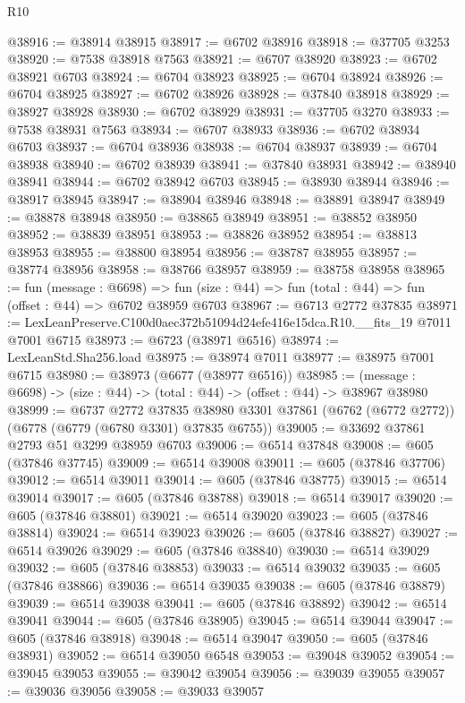\begin{lexlean}{R10}
\begin{coremodule}
@38916 := @38914 @38915
@38917 := @6702 @38916
@38918 := @37705 @3253
@38920 := @7538 @38918 @7563
@38921 := @6707 @38920
@38923 := @6702 @38921 @6703
@38924 := @6704 @38923
@38925 := @6704 @38924
@38926 := @6704 @38925
@38927 := @6702 @38926
@38928 := @37840 @38918
@38929 := @38927 @38928
@38930 := @6702 @38929
@38931 := @37705 @3270
@38933 := @7538 @38931 @7563
@38934 := @6707 @38933
@38936 := @6702 @38934 @6703
@38937 := @6704 @38936
@38938 := @6704 @38937
@38939 := @6704 @38938
@38940 := @6702 @38939
@38941 := @37840 @38931
@38942 := @38940 @38941
@38944 := @6702 @38942 @6703
@38945 := @38930 @38944
@38946 := @38917 @38945
@38947 := @38904 @38946
@38948 := @38891 @38947
@38949 := @38878 @38948
@38950 := @38865 @38949
@38951 := @38852 @38950
@38952 := @38839 @38951
@38953 := @38826 @38952
@38954 := @38813 @38953
@38955 := @38800 @38954
@38956 := @38787 @38955
@38957 := @38774 @38956
@38958 := @38766 @38957
@38959 := @38758 @38958
@38965 := fun (message : @6698) =>
  fun (size : @44) => fun (total : @44) => fun (offset : @44) => @6702 @38959 @6703
@38967 := @6713 @2772 @37835
@38971 := LexLeanPreserve.C100d0aec372b51094d24efe416e15dca.R10.__fits_19 @7011 @7001 @6715
@38973 := @6723 (@38971 @6516)
@38974 := LexLeanStd.Sha256.load
@38975 := @38974 @7011
@38977 := @38975 @7001 @6715
@38980 := @38973 (@6677 (@38977 @6516))
@38985 := (message : @6698) -> (size : @44) -> (total : @44) -> (offset : @44) -> @38967 @38980
@38999 := @6737
    @2772
    @37835
    @38980
    @3301
    @37861
    (@6762 (@6772 @2772))
    (@6778 (@6779 (@6780 @3301) @37835 @6755))
@39005 := @33692 @37861 @2793 @51 @3299 @38959 @6703
@39006 := @6514 @37848
@39008 := @605 (@37846 @37745)
@39009 := @6514 @39008
@39011 := @605 (@37846 @37706)
@39012 := @6514 @39011
@39014 := @605 (@37846 @38775)
@39015 := @6514 @39014
@39017 := @605 (@37846 @38788)
@39018 := @6514 @39017
@39020 := @605 (@37846 @38801)
@39021 := @6514 @39020
@39023 := @605 (@37846 @38814)
@39024 := @6514 @39023
@39026 := @605 (@37846 @38827)
@39027 := @6514 @39026
@39029 := @605 (@37846 @38840)
@39030 := @6514 @39029
@39032 := @605 (@37846 @38853)
@39033 := @6514 @39032
@39035 := @605 (@37846 @38866)
@39036 := @6514 @39035
@39038 := @605 (@37846 @38879)
@39039 := @6514 @39038
@39041 := @605 (@37846 @38892)
@39042 := @6514 @39041
@39044 := @605 (@37846 @38905)
@39045 := @6514 @39044
@39047 := @605 (@37846 @38918)
@39048 := @6514 @39047
@39050 := @605 (@37846 @38931)
@39052 := @6514 @39050 @6548
@39053 := @39048 @39052
@39054 := @39045 @39053
@39055 := @39042 @39054
@39056 := @39039 @39055
@39057 := @39036 @39056
@39058 := @39033 @39057

\end{coremodule}
\end{lexlean}
